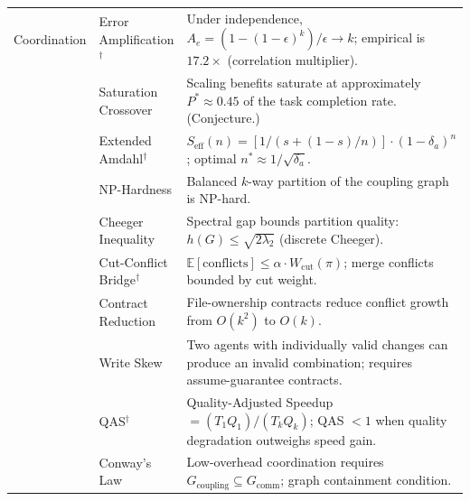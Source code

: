 \documentclass[11pt, a4paper, logo, copyright]{googledeepmind}
\begin{document}
\begin{appendices}
\begin{longtable}{p{1.6cm}p{3.2cm}p{7.8cm}}
\midrule

Coordination
    & Error Amplification$^\dagger$ & Under independence, $A_e = (1-(1-\epsilon)^k)/\epsilon \to k$; empirical is $17.2\times$ (correlation multiplier). \\
    & Saturation Crossover & Scaling benefits saturate at approximately $P^* \approx 0.45$ of the task completion rate. (Conjecture.) \\
    & Extended Amdahl$^\dagger$ & $S_{\text{eff}}(n) = [1/(s+(1-s)/n)] \cdot (1-\delta_a)^n$; optimal $n^* \approx 1/\sqrt{\delta_a}$. \\
    & NP-Hardness & Balanced $k$-way partition of the coupling graph is NP-hard. \\
    & Cheeger Inequality & Spectral gap bounds partition quality: $h(G) \leq \sqrt{2\lambda_2}$ (discrete Cheeger). \\
    & Cut-Conflict Bridge$^\dagger$ & $\mathbb{E}[\text{conflicts}] \leq \alpha \cdot W_{\text{cut}}(\pi)$; merge conflicts bounded by cut weight. \\
    & Contract Reduction & File-ownership contracts reduce conflict growth from $O(k^2)$ to $O(k)$. \\
    & Write Skew & Two agents with individually valid changes can produce an invalid combination; requires assume-guarantee contracts. \\
    & QAS$^\dagger$ & Quality-Adjusted Speedup $= (T_1 Q_1)/(T_k Q_k)$; QAS $< 1$ when quality degradation outweighs speed gain. \\
    & Conway's Law & Low-overhead coordination requires $G_{\text{coupling}} \subseteq G_{\text{comm}}$; graph containment condition. \\

\midrule


\end{longtable}
\end{appendices}
\end{document}
